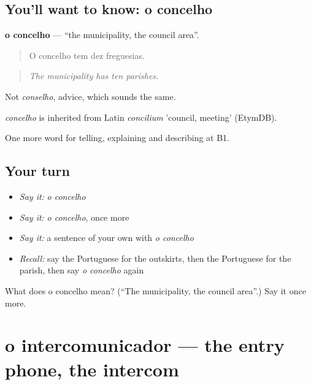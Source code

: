 \subsection*{You'll want to know: o concelho}
\textbf{o concelho} — \textquotedblleft{}the municipality, the council area\textquotedblright{}.

\begin{quote}
O concelho tem dez freguesias.
\end{quote}

\begin{quote}
\emph{The municipality has ten parishes.}
\end{quote}

Not \emph{conselho}, advice, which sounds the same.

\begin{cousinweb}
\emph{concelho} is inherited from Latin \emph{concilium} 'council, meeting' (EtymDB).
\end{cousinweb}

\begin{grammarlens}[title={What you've built}]
One more word for telling, explaining and describing at B1.
\end{grammarlens}

\subsection*{Your turn}
\begin{itemize}
\raggedright
  \item \emph{Say it:} \emph{o concelho}
  \item \emph{Say it:} \emph{o concelho}, once more
  \item \emph{Say it:} a sentence of your own with \emph{o concelho}
  \item \emph{Recall:} say the Portuguese for the outskirts, then the Portuguese for the parish, then say \emph{o concelho} again
\end{itemize}

\begin{tcolorbox}[breakable,colback=teal!4,colframe=teal!35!black,title={Before you move on}]
What does o concelho mean? (\textquotedblleft{}The municipality, the council area\textquotedblright{}.) Say it once more.
\end{tcolorbox}
\section[o intercomunicador]{o intercomunicador — the entry phone, the intercom}

